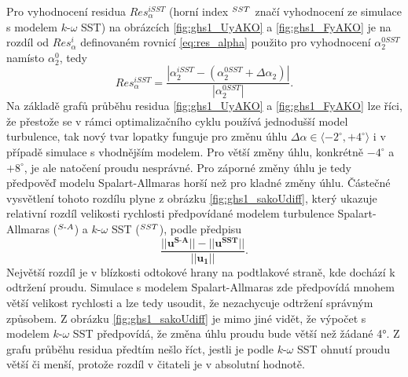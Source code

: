 Pro vyhodnocení residua $ Res_\alpha^{iSST} $ (horní index $ \null^{SST} $ značí vyhodnocení ze simulace s modelem $k\text{-}\omega$ SST) na obrázcích \ref{fig:ghs1_UyAKO} a \ref{fig:ghs1_FyAKO} je na rozdíl od $ Res_\alpha^i $ definovaném rovnicí \ref{eq:res_alpha} použito pro vyhodnocení $ \alpha_{2}^{0SST} $ namísto $ \alpha_{2}^{0} $, tedy
\begin{equation}\label{eq:res_alphaSST}
Res_\alpha^{iSST} = \dfrac{| \alpha_{2}^{iSST}-( \alpha_{2}^{0SST}+\Delta\alpha_2 ) |} {|\alpha_{2}^{0SST}|}.
\end{equation}
Na základě grafů průběhu residua \ref{fig:ghs1_UyAKO} a \ref{fig:ghs1_FyAKO} lze říci, že přestože se v rámci optimalizačního cyklu používá jednodušší model turbulence, tak nový tvar lopatky funguje pro změnu úhlu $ \Delta\alpha\in\langle -2^\circ,+4^\circ\rangle $ i v případě simulace s vhodnějším modelem. Pro větší změny úhlu, konkrétně $ -4^\circ $ a $ +8^\circ $, je ale natočení proudu nesprávné. Pro záporné změny úhlu je tedy předpověď modelu Spalart-Allmaras horší než pro kladné změny úhlu.
Částečné vysvětlení tohoto rozdílu plyne z obrázku \ref{fig:ghs1_sakoUdiff}, který ukazuje relativní rozdíl velikosti rychlosti předpovídané modelem turbulence Spalart-Allmaras ($ \null^{S\text{-}A} $) a $k\text{-}\omega$ SST ($ \null^{SST} $), podle předpisu
\begin{equation}\label{eq:ghs1_sakoUdiff}
\dfrac{||\mathbf{u^{S\text{-}A}||-||u^{SST}}||}{||\mathbf{u_1}||}.
\end{equation}
Největší rozdíl je v blízkosti odtokové hrany na podtlakové straně, kde dochází k odtržení proudu. Simulace s modelem Spalart-Allmaras zde předpovídá mnohem větší velikost rychlosti a lze tedy usoudit, že nezachycuje odtržení správným způsobem. Z obrázku \ref{fig:ghs1_sakoUdiff} je mimo jiné vidět, že výpočet s modelem $k\text{-}\omega$ SST předpovídá, že změna úhlu proudu bude větší než žádané 4°. Z grafu průběhu residua předtím nešlo říct, jestli je podle $k\text{-}\omega$ SST ohnutí proudu větší či menší, protože rozdíl v čitateli je v absolutní hodnotě.
